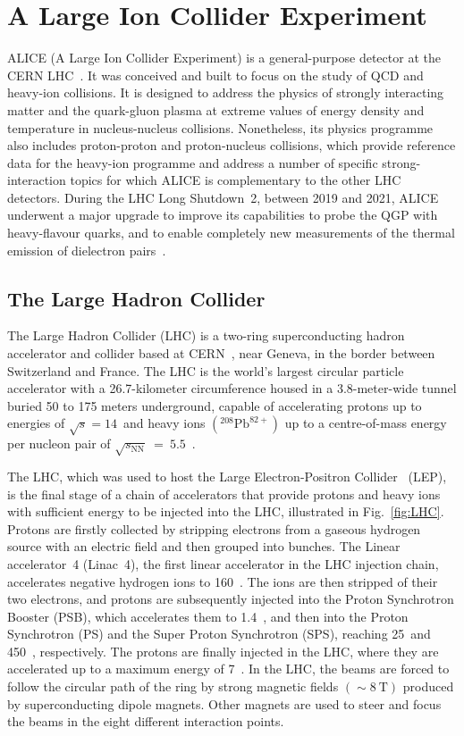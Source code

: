 \chapter{A Large Ion Collider Experiment}\label{chap:ALICE}

\lettrine[lines=6,findent=0.pt]{A}{LICE}  (A Large Ion Collider Experiment) is a general-purpose detector at the CERN LHC~\cite{ALICE:2008ngc}. It was conceived and built to focus on the study of QCD and heavy-ion collisions. It is designed to address the physics of strongly interacting matter and the quark-gluon plasma at extreme values of energy density and temperature in nucleus-nucleus collisions. Nonetheless, its physics programme also includes proton-proton and proton-nucleus collisions, which provide reference data for the heavy-ion programme and address a number of specific strong-interaction topics for which ALICE is complementary to the other LHC detectors. During the LHC Long Shutdown~2, between 2019 and 2021, ALICE underwent a major upgrade to improve its capabilities to probe the QGP with heavy-flavour quarks, and to enable completely new measurements of the thermal emission of dielectron pairs~\cite{ALICE:2023udb}.


\section{The Large Hadron Collider}
\begin{sloppypar}
The Large Hadron Collider (LHC) is a two-ring superconducting hadron accelerator and collider based at CERN~\cite{Evans:2008zzb}, near Geneva, in the border between Switzerland and France. The LHC is the world's largest circular particle accelerator with a 26.7-kilometer circumference housed in a 3.8-meter-wide tunnel buried 50 to 175 meters underground, capable of accelerating protons up to energies of ${\sqrt{s} = 14}$~\tev and heavy ions $({}^{208}\mathrm{Pb}^{82+})$ up to a centre-of-mass energy per nucleon pair of $\sqrt{s_\mathrm{NN}}~=~5.5$~\tev. 
\end{sloppypar}
The LHC, which was used to host the Large Electron-Positron Collider~\cite{Myers:1991ym} (LEP), is the final stage of a chain of accelerators that provide protons and heavy ions with sufficient energy to be injected into the LHC, illustrated in Fig.~\ref{fig:LHC}. Protons are firstly collected by stripping electrons from a gaseous hydrogen source with an electric field and then grouped into bunches. The Linear accelerator~4 (Linac~4), the first linear accelerator in the LHC injection chain, accelerates negative hydrogen ions to 160~\mev. The ions are then stripped of their two electrons, and protons are subsequently injected into the Proton Synchrotron Booster (PSB), which accelerates them to 1.4~\gev, and then into the Proton Synchrotron (PS) and the Super Proton Synchrotron (SPS), reaching 25~\gev and 450~\gev, respectively. The protons are finally injected in the LHC, where they are accelerated up to a maximum energy of 7~\tev. In the LHC, the beams are forced to follow the circular path of the ring by strong magnetic fields $(\sim 8~\mathrm{T})$ produced by superconducting dipole magnets. Other magnets are used to steer and focus the beams in the eight different interaction points. 

